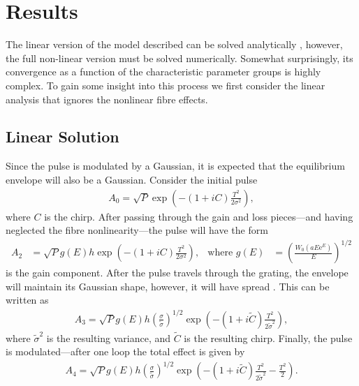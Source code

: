 \documentclass[12pt]{article}
\begin{document}
\section{Results}
The linear version of the model described can be solved analytically , however, the full non-linear version must be solved numerically. Somewhat surprisingly, its convergence as a function of the characteristic parameter groups is highly complex. To gain some insight into this process we first consider the linear analysis that ignores the nonlinear fibre effects.

\subsection{Linear Solution}



Since the pulse is modulated by a Gaussian, it is expected that the equilibrium envelope will also be a Gaussian. Consider the initial pulse
\begin{align*}
	A_0 = \sqrt{P} \exp \left( -(1 + iC) \frac{T^2}{2 \sigma^2} \right),
\end{align*}
where $C$ is the chirp. After passing through the gain and loss pieces---and having neglected the fibre nonlinearity---the pulse will have the form
\begin{align*}
	A_2 &= \sqrt{P} g(E) h \exp \left( -(1 + iC) \frac{T^2}{2 \sigma^2} \right),&
	\text{where } g(E) &= \left( \frac{W_0(a E \textrm{e}^E)}{E} \right)^{1/2}
\end{align*}
is the gain component. After the pulse travels through the grating, the envelope will maintain its Gaussian shape, however, it will have spread \cite{agrawal2013}. This can be written as
\begin{align}
\label{linear1}
	A_3 = \sqrt{P} g(E) h \left( \frac{\sigma}{\widetilde{\sigma}} \right)^{1/2} \exp \left( -(1 + i \widetilde{C}) \frac{T^2}{2 \widetilde{\sigma}^2} \right),
\end{align}
where $\widetilde{\sigma}^2$ is the resulting variance, and $\widetilde{C}$ is the resulting chirp. Finally, the pulse is modulated---after one loop the total effect is given by
\begin{align}
\label{linear2}
	A_4 = \sqrt{P} g(E) h \left( \frac{\sigma}{\widetilde{\sigma}} \right)^{1/2} \exp \left( -(1 + i \widetilde{C}) \frac{T^2}{2 \widetilde{\sigma}^2} - \frac{T^2}{2} \right).
\end{align}
\end{document}
